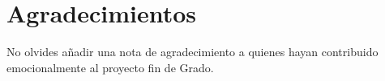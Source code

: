 \chapter*{Agradecimientos}

No olvides añadir una nota de agradecimiento a quienes hayan contribuido emocionalmente al proyecto fin de Grado.
